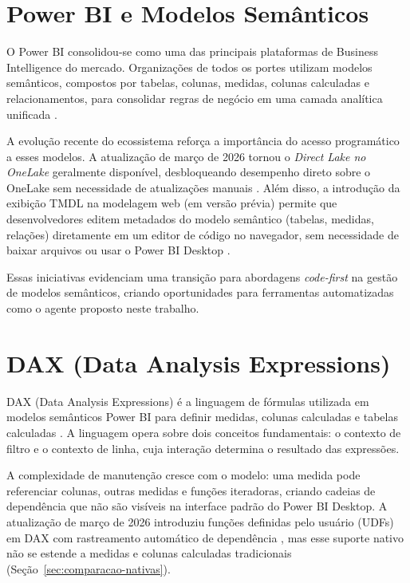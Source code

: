 \documentclass[
    12pt,               %
    openright,          %
    oneside,            %
    a4paper,            %
    chapter=TITLE,      %
    section=TITLE,      %
    brazil              %
]{abntex2}
\begin{document}
\section{Power BI e Modelos Semânticos}

O Power BI consolidou-se como uma das principais plataformas de Business Intelligence do mercado. Organizações de todos os portes utilizam modelos semânticos, compostos por tabelas, colunas, medidas, colunas calculadas e relacionamentos, para consolidar regras de negócio em uma camada analítica unificada \cite{russo2022dax}.

A evolução recente do ecossistema reforça a importância do acesso programático a esses modelos. A atualização de março de 2026 tornou o \textit{Direct Lake no OneLake} geralmente disponível, desbloqueando desempenho direto sobre o OneLake sem necessidade de atualizações manuais \cite{microsoft2026pbimarco}. Além disso, a introdução da exibição TMDL na modelagem web (em versão prévia) permite que desenvolvedores editem metadados do modelo semântico (tabelas, medidas, relações) diretamente em um editor de código no navegador, sem necessidade de baixar arquivos ou usar o Power BI Desktop \cite{microsoft2025tmdl}.

Essas iniciativas evidenciam uma transição para abordagens \textit{code-first} na gestão de modelos semânticos, criando oportunidades para ferramentas automatizadas como o agente proposto neste trabalho.

\section{DAX (Data Analysis Expressions)}

DAX (Data Analysis Expressions) é a linguagem de fórmulas utilizada em modelos semânticos Power BI para definir medidas, colunas calculadas e tabelas calculadas \cite{russo2022dax}. A linguagem opera sobre dois conceitos fundamentais: o contexto de filtro e o contexto de linha, cuja interação determina o resultado das expressões.

A complexidade de manutenção cresce com o modelo: uma medida pode referenciar colunas, outras medidas e funções iteradoras, criando cadeias de dependência que não são visíveis na interface padrão do Power BI Desktop. A atualização de março de 2026 introduziu funções definidas pelo usuário (UDFs) em DAX com rastreamento automático de dependência \cite{microsoft2026daxudf}, mas esse suporte nativo não se estende a medidas e colunas calculadas tradicionais (Seção~\ref{sec:comparacao-nativas}).
\end{document}
